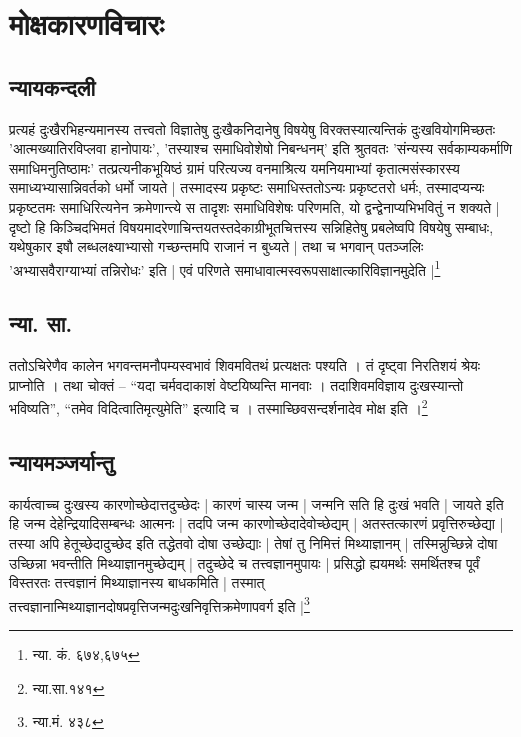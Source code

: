 \section{मोक्षकारणविचारः}

\subsection{न्यायकन्दली} प्रत्यहं दुःखैरभिहन्यमानस्य तत्त्वतो विज्ञातेषु दुःखैकनिदानेषु विषयेषु विरक्तस्यात्यन्तिकं दुःखवियोगमिच्छतः 'आत्मख्यातिरविप्लवा हानोपायः', 'तस्याश्च समाधिवोशेषो निबन्धनम्' इति श्रुतवतः 'संन्यस्य सर्वकाम्यकर्माणि समाधिमनुतिष्ठामः' तत्प्रत्यनीकभूयिष्ठं ग्रामं परित्यज्य वनमाश्रित्य यमनियमाभ्यां कृतात्मसंस्कारस्य समाध्यभ्यासान्निवर्तको धर्मो जायते | तस्मादस्य प्रकृष्टः समाधिस्ततोऽन्यः प्रकृष्टतरो धर्मः, तस्मादप्यन्यः‌ प्रकृष्टतमः समाधिरित्यनेन क्रमेणान्त्ये स तादृशः समाधिविशेषः परिणमति, यो द्वन्द्वेनाप्यभिभवितुं न शक्यते | दृष्टो हि किञ्चिदभिमतं विषयमादरेणाचिन्तयतस्तदेकाग्रीभूतचित्तस्य सन्निहितेषु प्रबलेष्वपि विषयेषु सम्बाधः, यथेषुकार इषौ लब्धलक्ष्याभ्यासो गच्छन्तमपि राजानं न बुध्यते | तथा च भगवान् पतञ्जलिः 'अभ्यासवैराग्याभ्यां तन्निरोधः' इति | एवं परिणते समाधावात्मस्वरूपसाक्षात्कारिविज्ञानमुदेति |\footnote{न्या. कं. ६७४,६७५}


\subsection{न्या. सा.} ततोऽचिरेणैव कालेन भगवन्तमनौपम्यस्वभावं शिवमवितथं प्रत्यक्षतः पश्यति । तं दृष्ट्वा निरतिशयं श्रेयः प्राप्नोति । तथा चोक्तं – “यदा चर्मवदाकाशं वेष्टयिष्यन्ति मानवाः । तदाशिवमविज्ञाय दुःखस्यान्तो भविष्यति”, “तमेव विदित्वातिमृत्युमेति” इत्यादि च । तस्माच्छिवसन्दर्शनादेव मोक्ष इति ।\footnote{न्या.सा.१४१}


\subsection{न्यायमञ्जर्यान्तु} कार्यत्वाच्च दुःखस्य कारणोच्छेदात्तदुच्छेदः | कारणं चास्य जन्म | जन्मनि सति हि दुःखं भवति | जायते इति हि जन्म देहेन्द्रियादिसम्बन्धः आत्मनः | तदपि जन्म कारणोच्छेदादेवोच्छेद्यम् | अतस्तत्कारणं प्रवृत्तिरुच्छेद्या | तस्या अपि हेतूच्छेदादुच्छेद इति तद्धेतवो दोषा उच्छेद्याः | तेषां तु निमित्तं मिथ्याज्ञानम् | तस्मिन्नुच्छिन्ने दोषा उच्छिन्ना भवन्तीति मिथ्याज्ञानमुच्छेद्यम् | तदुच्छेदे च तत्त्वज्ञानमुपायः | प्रसिद्धो ह्ययमर्थः समर्थितश्च पूर्वं विस्तरतः तत्त्वज्ञानं मिथ्याज्ञानस्य बाधकमिति | तस्मात् तत्त्वज्ञानान्मिथ्याज्ञानदोषप्रवृत्तिजन्मदुःखनिवृत्तिक्रमेणापवर्ग इति |\footnote{न्या.मं. ४३८}
 


